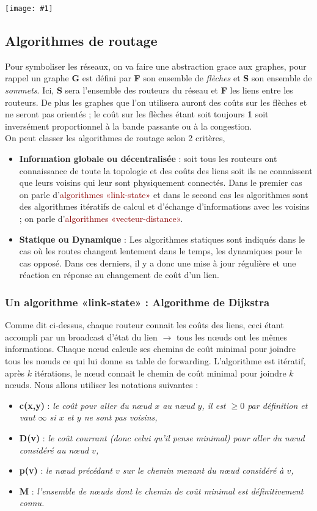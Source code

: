\documentclass{article}
\newcommand{\red}[1]{\textcolor{darkred}{#1}}
\newcommand{\imgR}[2]{\begin{center}\texttt{[image: \#1]}\end{center}}
\newcommand{\bfp}[2]{\item \textbf{#1} : \textit{#2}}
\begin{document}
\imgR{CN_084.png}{300}

\subsection{Algorithmes de routage}

Pour symboliser les réseaux, on va faire une abstraction grace aux graphes, pour rappel un graphe \textbf{G} est 
défini par \textbf{F} son ensemble de \textit{flèches} et \textbf{S} son ensemble de \textit{sommets}. Ici, 
\textbf{S} sera l'ensemble des routeurs du réseau et \textbf{F} les liens entre les routeurs. De plus les graphes 
que l'on utilisera auront des coûts sur les flèches et ne seront pas orientés ; le coût sur les flèches étant 
soit toujours \textbf{1} soit inversément proportionnel à la bande passante ou à la congestion. \\

\noindent On peut classer les algorithmes de routage selon 2 critères,
\begin{itemize}
\item \textbf{Information globale ou décentralisée} : soit tous les routeurs ont connaissance de toute la 
topologie et des coûts des liens soit ils ne connaissent que leurs voisins qui leur sont physiquement connectés. 
Dans le premier cas on parle d'\red{algorithmes «link-state»} et dans le second cas les algorithmes sont des 
algorithmes itératifs de calcul et d'échange d'informations avec les voisins ; on parle d'\red{algorithmes 
«vecteur-distance»}.
\newpage
\item \textbf{Statique ou Dynamique} : Les algorithmes statiques sont indiqués dans le cas où les routes changent
lentement dans le temps, les dynamiques pour le cas opposé. Dans ces derniers, il y a donc une mise à jour 
régulière et une réaction en réponse au changement de coût d'un lien.
\end{itemize}

\subsubsection{Un algorithme «link-state» : Algorithme de Dijkstra}

Comme dit ci-dessus, chaque routeur connait les coûts des liens, ceci étant accompli par un broadcast d'état du 
lien $\rightarrow$ tous les n\oe uds ont les mêmes informations. Chaque n\oe ud calcule ses chemins de coût 
minimal pour joindre tous les n\oe uds ce qui lui donne sa table de forwarding. L'algorithme est itératif, après 
$k$ itérations, le n\oe ud connait le chemin de coût minimal pour joindre $k$ n\oe uds. Nous allons utiliser les 
notations suivantes : 
\begin{itemize}
\bfp{c(x,y)}{le coût pour aller du n\oe ud $x$ au n\oe ud $y$, il est $\geq 0$ par définition et vaut $\infty$ si 
$x$ et $y$ ne sont pas voisins,}
\bfp{D(v)}{le coût courrant (donc celui qu'il pense minimal) pour aller du n\oe ud considéré au n\oe ud $v$,}
\bfp{p(v)}{le n\oe ud précédant $v$ sur le chemin menant du n\oe ud considéré à $v$,}
\bfp{M}{l'ensemble de n\oe uds dont le chemin de coût minimal est définitivement connu.} \\
\end{itemize}
\end{document}
